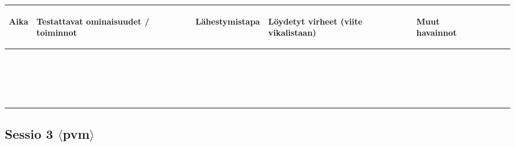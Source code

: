 \begin{landscape}
\begin{longtable}{|>{\raggedright}p{2.4cm}|>{\raggedright}p{5.7cm}|>{\raggedright}p{4.2cm}|>{\raggedright}p{4.2cm}|p{4.2cm}|}
	\hline
	\begin{bfseries}Aika\end{bfseries} & \begin{bfseries}Testattavat ominaisuudet / toiminnot\end{bfseries} & \begin{bfseries}Lähestymistapa\end{bfseries} & \begin{bfseries}Löydetyt virheet (viite vikalistaan)\end{bfseries} & \begin{bfseries}Muut havainnot\end{bfseries} \endhead
	\hline
	 &  &  &  &  \\
	\hline
	 &  &  &  &  \\
	\hline
	 &  &  &  &  \\
	\hline
	 &  &  &  &  \\
	\hline
	 &  &  &  &  \\
	\hline
	 &  &  &  &  \\
	\hline
	 &  &  &  &  \\
	\hline
	 &  &  &  &  \\
	\hline
	 &  &  &  &  \\
	\hline
	 &  &  &  &  \\
	\hline
	 &  &  &  &  \\
	\hline
	 &  &  &  &  \\
	\hline
	 &  &  &  &  \\
	\hline
	 &  &  &  &  \\
	\hline
	 &  &  &  &  \\
	\hline
	 &  &  &  &  \\
	\hline
	 &  &  &  &  \\
	\hline
	 &  &  &  &  \\
	\hline
	 &  &  &  &  \\
	\hline
	 &  &  &  &  \\
	\hline
\end{longtable}

\subsection{Sessio 3 $\langle$pvm$\rangle$}


\end{landscape}

